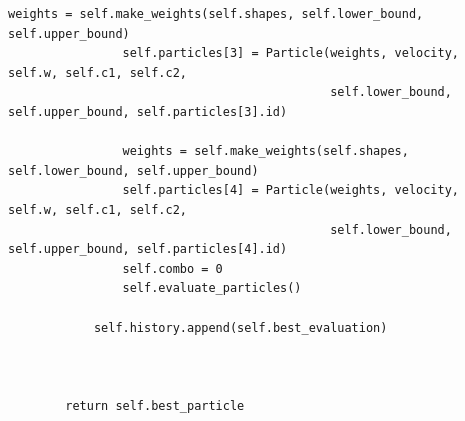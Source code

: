 \documentclass[a4paper]{article}
\begin{document}
\begin{lstlisting}[caption={Klasa korišćena za sam algoritam},frame=single, label=simple]
                weights = self.make_weights(self.shapes, self.lower_bound, self.upper_bound)
                self.particles[3] = Particle(weights, velocity, self.w, self.c1, self.c2, 
                                             self.lower_bound, self.upper_bound, self.particles[3].id)
                
                weights = self.make_weights(self.shapes, self.lower_bound, self.upper_bound)
                self.particles[4] = Particle(weights, velocity, self.w, self.c1, self.c2, 
                                             self.lower_bound, self.upper_bound, self.particles[4].id)
                self.combo = 0
                self.evaluate_particles()
            
            self.history.append(self.best_evaluation)   
                
                
            
        return self.best_particle

\end{lstlisting}
\end{document}
